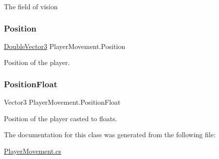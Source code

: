 The field of vision 

\mbox{\label{class_player_movement_ab91c0a1effeb227350b5f20fb4fa3635}} 
\subsubsection{\texorpdfstring{Position}{Position}}
{\footnotesize\ttfamily \mbox{\hyperlink{class_double_vector3}{Double\+Vector3}} Player\+Movement.\+Position\hspace{0.3cm}{\ttfamily [get]}}



Position of the player. 

\mbox{\label{class_player_movement_aff90fe02ac21c9e00aa3e429e02b24e2}} 
\subsubsection{\texorpdfstring{PositionFloat}{PositionFloat}}
{\footnotesize\ttfamily Vector3 Player\+Movement.\+Position\+Float\hspace{0.3cm}{\ttfamily [get]}}



Position of the player casted to floats. 



The documentation for this class was generated from the following file\+:\begin{DoxyCompactItemize}
\item 
\mbox{\hyperlink{_player_movement_8cs}{Player\+Movement.\+cs}}\end{DoxyCompactItemize}
